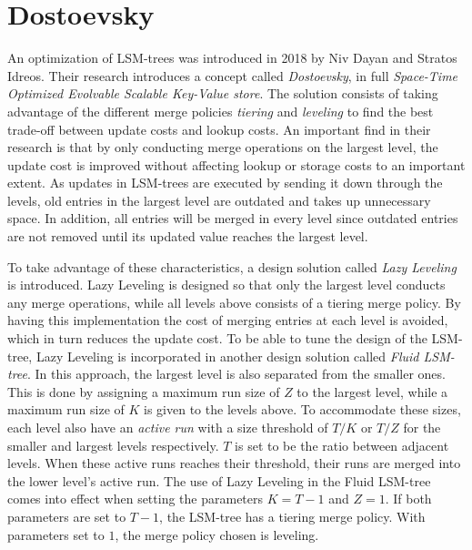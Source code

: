 \section{Dostoevsky}
\label{Dostoevsky}
An optimization of LSM-trees was introduced in 2018 by Niv Dayan and Stratos Idreos. Their research introduces a concept called \emph{Dostoevsky}, in full \emph{Space-Time Optimized Evolvable Scalable Key-Value store}\cite{Dostoevsky}. The solution consists of taking advantage of the different merge policies \emph{tiering} and \emph{leveling} to find the best trade-off between update costs and lookup costs. An important find in their research is that by only conducting merge operations on the largest level, the update cost is improved without affecting lookup or storage costs to an important extent. As updates in LSM-trees are executed by sending it down through the levels, old entries in the largest level are outdated and takes up unnecessary space. In addition, all entries will be merged in every level since outdated entries are not removed until its updated value reaches the largest level.\newline 

To take advantage of these characteristics, a design solution called \emph{Lazy Leveling} is introduced. Lazy Leveling is designed so that only the largest level conducts any merge operations, while all levels above consists of a tiering merge policy. By having this implementation the cost of merging entries at each level is avoided, which in turn reduces the update cost. To be able to tune the design of the LSM-tree, Lazy Leveling is incorporated in another design solution called \emph{Fluid LSM-tree}. In this approach, the largest level is also separated from the smaller ones. This is done by assigning a maximum run size of $Z$ to the largest level, while a maximum run size of $K$ is given to the levels above. To accommodate these sizes, each level also have an \emph{active run} with a size threshold of $T/K$ or $T/Z$ for the smaller and largest levels respectively. $T$ is set to be the ratio between adjacent levels. When these active runs reaches their threshold, their runs are merged into the lower level's active run. The use of Lazy Leveling in the Fluid LSM-tree comes into effect when setting the parameters $K=T-1$ and $Z = 1$. If both parameters are set to $T-1$, the LSM-tree has a tiering merge policy. With parameters set to $1$, the merge policy chosen is leveling. \newline

